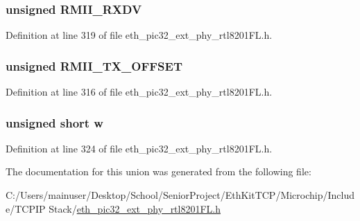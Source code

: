 \subsubsection[{R\+M\+I\+I\+\_\+\+R\+X\+D\+V}]{\setlength{\rightskip}{0pt plus 5cm}unsigned R\+M\+I\+I\+\_\+\+R\+X\+D\+V}\label{union___r_m_i_i_m_o_d_e_s_e_t_t_i_ngbits__t_abb141ef083a305a5f0f41c00802fd3b8}


Definition at line 319 of file eth\+\_\+pic32\+\_\+ext\+\_\+phy\+\_\+rtl8201\+F\+L.\+h.

\hypertarget{union___r_m_i_i_m_o_d_e_s_e_t_t_i_ngbits__t_affaeee571946c827953af4cd20a48ecd}{}
\subsubsection[{R\+M\+I\+I\+\_\+\+T\+X\+\_\+\+O\+F\+F\+S\+E\+T}]{\setlength{\rightskip}{0pt plus 5cm}unsigned R\+M\+I\+I\+\_\+\+T\+X\+\_\+\+O\+F\+F\+S\+E\+T}\label{union___r_m_i_i_m_o_d_e_s_e_t_t_i_ngbits__t_affaeee571946c827953af4cd20a48ecd}


Definition at line 316 of file eth\+\_\+pic32\+\_\+ext\+\_\+phy\+\_\+rtl8201\+F\+L.\+h.

\hypertarget{union___r_m_i_i_m_o_d_e_s_e_t_t_i_ngbits__t_a160850a4684a3e82c2323033964f2e98}{}
\subsubsection[{w}]{\setlength{\rightskip}{0pt plus 5cm}unsigned short w}\label{union___r_m_i_i_m_o_d_e_s_e_t_t_i_ngbits__t_a160850a4684a3e82c2323033964f2e98}


Definition at line 324 of file eth\+\_\+pic32\+\_\+ext\+\_\+phy\+\_\+rtl8201\+F\+L.\+h.



The documentation for this union was generated from the following file\+:\begin{DoxyCompactItemize}
\item 
C\+:/\+Users/mainuser/\+Desktop/\+School/\+Senior\+Project/\+Eth\+Kit\+T\+C\+P/\+Microchip/\+Include/\+T\+C\+P\+I\+P Stack/\hyperlink{eth__pic32__ext__phy__rtl8201_f_l_8h}{eth\+\_\+pic32\+\_\+ext\+\_\+phy\+\_\+rtl8201\+F\+L.\+h}\end{DoxyCompactItemize}
